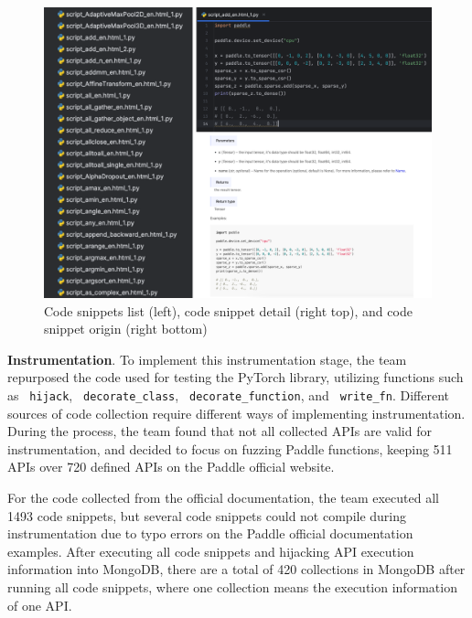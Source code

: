 \documentclass[sigconf]{acmart}
\begin{document}
  \begin{figure}[h]
    \centering
    \includegraphics[width=\linewidth]{2.png}
    \caption{Code snippets list (left), code snippet detail (right top), and code snippet origin (right bottom)}
  \end{figure}  

  \textbf{Instrumentation}. To implement this instrumentation stage, the team repurposed the code used for testing the PyTorch library, 
  utilizing functions such as \verb| hijack|, \verb| decorate_class|, \verb| decorate_function|, and \verb| write_fn|. Different sources of code collection require different ways of implementing instrumentation. 
  During the process, the team found that not all collected APIs are valid for instrumentation, and decided to focus on fuzzing Paddle functions, keeping 511 APIs over 720 defined APIs on the Paddle official website.
  
  \par For the code collected from the official documentation, the team executed all 1493 code snippets, but several code snippets could not compile during instrumentation due to typo errors on the Paddle official documentation examples. 
  After executing all code snippets and hijacking API execution information into MongoDB, there are a total of 420 collections in MongoDB after running all code snippets, 
  where one collection means the execution information of one API.
\end{document}
